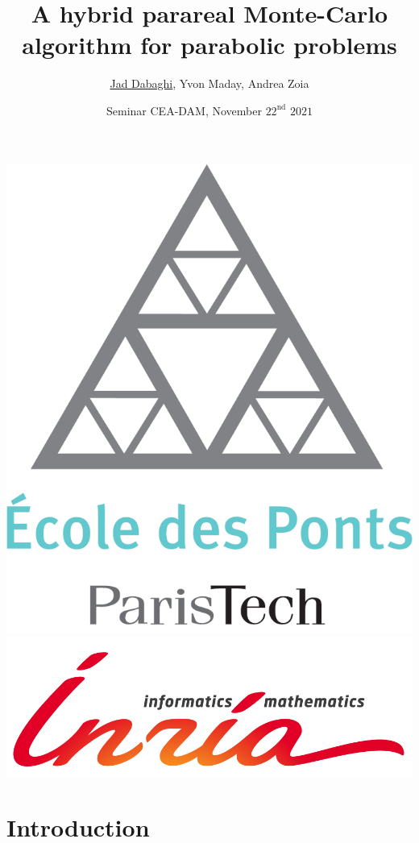 \documentclass[aspectratio=169]{beamer}
\title[CEA DAM presentation]{A hybrid parareal Monte-Carlo algorithm for parabolic  problems}
\author[Jad Dabaghi]
{\underline{Jad Dabaghi}, Yvon Maday, Andrea Zoia}
\institute[]{CERMICS, \'{E}cole des Ponts ParisTech}
\date{Seminar CEA-DAM, November $22^{\mathrm{nd}}$ $2021$}
\begin{document}
\begin{frame}
\maketitle
\includegraphics[scale=0.09]{image/Logo_ponts_paristech}
\hfill \includegraphics[scale=0.25]{image/INRIA-SCIENTIFIQUE-UK-RVB}

\end{frame}




\newcommand{\kk}{\textcolor{royalblue}{k}}
\newcommand{\ii}{\textcolor{burntorange}{i}}
\newcommand{\nuu}{\textcolor{burntorange}{\nu}}


\setcounter{tocdepth}{4}
\section{Introduction}
\end{document}
